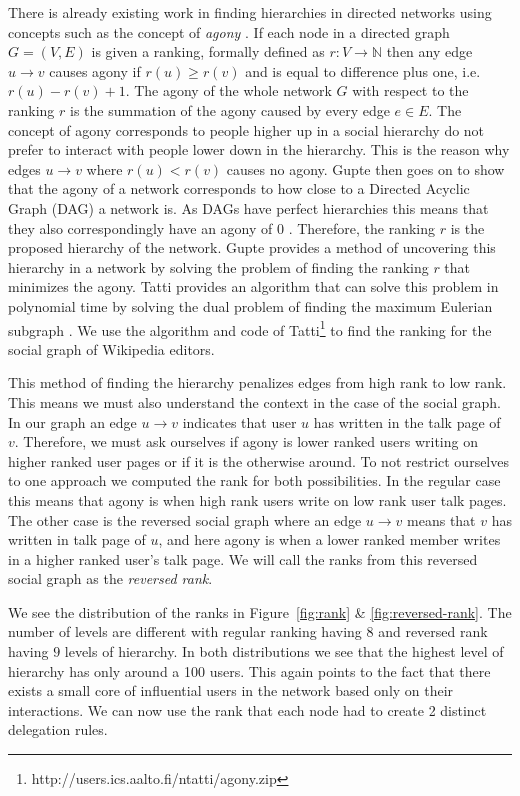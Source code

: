 There is already existing work in finding hierarchies in directed networks using concepts such as the concept of \textit{agony} \cite{Tatti2016,gupte2011finding}. If each node in a directed graph $G = (V,E)$ is given a ranking, formally defined as $r:V\rightarrow \mathbb{N}$ then any edge $u\rightarrow v$ causes agony if $r(u)\geq r(v)$ and is equal to difference plus one, i.e. $r(u)-r(v)+1$. The agony of the whole network $G$ with respect to the ranking $r$ is the summation of the agony caused by every edge $e \in E$. The concept of agony corresponds to people higher up in a social hierarchy do not prefer to interact with people lower down in the hierarchy. This is the reason why edges $u\rightarrow v$ where $r(u)<r(v)$ causes no agony. Gupte then goes on to show that the agony of a network corresponds to how close to a Directed Acyclic Graph (DAG) a network is. As DAGs have perfect hierarchies this means that they also correspondingly have an agony of $0$ \cite{gupte2011finding}. Therefore, the ranking $r$ is the proposed hierarchy of the network. Gupte provides a method of uncovering this hierarchy in a network by solving the problem of finding the ranking $r$ that minimizes the agony. Tatti provides an algorithm that can solve this problem in polynomial time by solving the dual problem of finding the maximum Eulerian subgraph \cite{Tatti2016}. We use the algorithm and code of Tatti\footnote{http://users.ics.aalto.fi/ntatti/agony.zip} to find the ranking for the social graph of Wikipedia editors. 

This method of finding the hierarchy penalizes edges from high rank to low rank. This means we must also understand the context in the case of the social graph. In our graph an edge $u \rightarrow v$ indicates that user $u$ has written in the talk page of $v$. Therefore, we must ask ourselves if agony is lower ranked users writing on higher ranked user pages or if it is the otherwise around. To not restrict ourselves to one approach we computed the rank for both possibilities. In the regular case this means that agony is when high rank users write on low rank user talk pages. The other case is the reversed social graph where an edge $u \rightarrow v$ means that $v$ has written in talk page of $u$, and here agony is when a lower ranked member writes in a higher ranked user's talk page. We will call the ranks from this reversed social graph as the \textit{reversed rank}. 

We see the distribution of the ranks in Figure~\ref{fig:rank} \& \ref{fig:reversed-rank}. The number of levels are different with regular ranking having $8$ and reversed rank having $9$ levels of hierarchy. In both distributions we see that the highest level of hierarchy has only around a 100 users. This again points to the fact that there exists a small core of influential users in the network based only on their interactions. We can now use the rank that each node had to create 2 distinct delegation rules.

